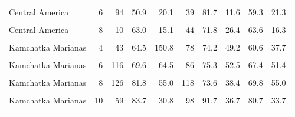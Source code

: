 \begin{ThreePartTable}
\begin{longtable}[t]{lrrrrrrrrr}
Central America & 6 & 94 & 50.9 & 20.1 & 39 & 81.7 & 11.6 & 59.3 & 21.3\\
\cellcolor{gray!6}{Central America} & \cellcolor{gray!6}{7} & \cellcolor{gray!6}{2} & \cellcolor{gray!6}{76.4} & \cellcolor{gray!6}{11.5} & \cellcolor{gray!6}{48} & \cellcolor{gray!6}{81.5} & \cellcolor{gray!6}{11.1} & \cellcolor{gray!6}{66.3} & \cellcolor{gray!6}{4.3}\\
Central America & 8 & 10 & 63.0 & 15.1 & 44 & 71.8 & 26.4 & 63.6 & 16.3\\
\cellcolor{gray!6}{Kamchatka Marianas} & \cellcolor{gray!6}{3} & \cellcolor{gray!6}{25} & \cellcolor{gray!6}{186.0} & \cellcolor{gray!6}{112.0} & \cellcolor{gray!6}{81} & \cellcolor{gray!6}{70.4} & \cellcolor{gray!6}{44.1} & \cellcolor{gray!6}{59.1} & \cellcolor{gray!6}{48.6}\\
Kamchatka Marianas & 4 & 43 & 64.5 & 150.8 & 78 & 74.2 & 49.2 & 60.6 & 37.7\\
\cellcolor{gray!6}{Kamchatka Marianas} & \cellcolor{gray!6}{5} & \cellcolor{gray!6}{79} & \cellcolor{gray!6}{54.0} & \cellcolor{gray!6}{63.5} & \cellcolor{gray!6}{123} & \cellcolor{gray!6}{95.4} & \cellcolor{gray!6}{46.2} & \cellcolor{gray!6}{87.8} & \cellcolor{gray!6}{50.2}\\
Kamchatka Marianas & 6 & 116 & 69.6 & 64.5 & 86 & 75.3 & 52.5 & 67.4 & 51.4\\
\cellcolor{gray!6}{Kamchatka Marianas} & \cellcolor{gray!6}{7} & \cellcolor{gray!6}{301} & \cellcolor{gray!6}{75.0} & \cellcolor{gray!6}{50.0} & \cellcolor{gray!6}{113} & \cellcolor{gray!6}{78.6} & \cellcolor{gray!6}{43.3} & \cellcolor{gray!6}{76.3} & \cellcolor{gray!6}{42.1}\\
Kamchatka Marianas & 8 & 126 & 81.8 & 55.0 & 118 & 73.6 & 38.4 & 69.8 & 55.0\\
\cellcolor{gray!6}{Kamchatka Marianas} & \cellcolor{gray!6}{9} & \cellcolor{gray!6}{172} & \cellcolor{gray!6}{89.0} & \cellcolor{gray!6}{82.8} & \cellcolor{gray!6}{153} & \cellcolor{gray!6}{76.0} & \cellcolor{gray!6}{61.0} & \cellcolor{gray!6}{72.4} & \cellcolor{gray!6}{57.2}\\
Kamchatka Marianas & 10 & 59 & 83.7 & 30.8 & 98 & 91.7 & 36.7 & 80.7 & 33.7\\
\cellcolor{gray!6}{Kamchatka Marianas} & \cellcolor{gray!6}{11} & \cellcolor{gray!6}{27} & \cellcolor{gray!6}{80.0} & \cellcolor{gray!6}{39.8} & \cellcolor{gray!6}{94} & \cellcolor{gray!6}{83.7} & \cellcolor{gray!6}{30.6} & \cellcolor{gray!6}{68.7} & \cellcolor{gray!6}{32.4}\\

\end{longtable}
\end{ThreePartTable}
